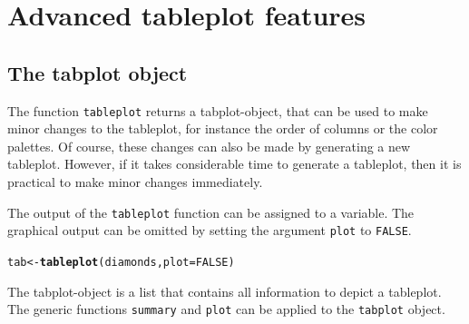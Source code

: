 \documentclass[11pt, fleqn, a4paper]{article}\usepackage{graphicx, color}
\makeatletter
\newcommand{\hlfunctioncall}[1]{\textcolor[rgb]{0.501960784313725,0,0.329411764705882}{\textbf{#1}}}%
\newenvironment{kframe}{%
 \def\FrameCommand##1{\hskip\@totalleftmargin \hskip-\fboxsep
 \colorbox{shadecolor}{##1}\hskip-\fboxsep
     \hskip-\linewidth \hskip-\@totalleftmargin \hskip\columnwidth}%
 \MakeFramed {\advance\hsize-\width
   \@totalleftmargin\z@ \linewidth\hsize
   \@setminipage}}%
 {\par\unskip\endMakeFramed}
\newenvironment{knitrout}{}{} %
\makeatother
\begin{document}
\section{Advanced tableplot features}

\subsection{The tabplot object}

The function {\tt tableplot} returns a tabplot-object, that can be used to make minor changes to the tableplot, for instance the order of columns or the color palettes. Of course, these changes can also be made by generating a new tableplot. However, if it takes considerable time to generate a tableplot, then it is practical to make minor changes immediately.

The output of the {\tt tableplot} function can be assigned to a variable. The graphical output can be omitted by setting the argument {\tt plot} to {\tt FALSE}.

\begin{knitrout}
\color{fgcolor}\begin{kframe}
\begin{alltt}
tab <- \hlfunctioncall{tableplot}(diamonds, plot = FALSE)
\end{alltt}
\end{kframe}
\end{knitrout}


The tabplot-object is a list that contains all information to depict a tableplot. The generic functions {\tt summary} and {\tt plot} can be applied to the {\tt tabplot} object.
\end{document}
